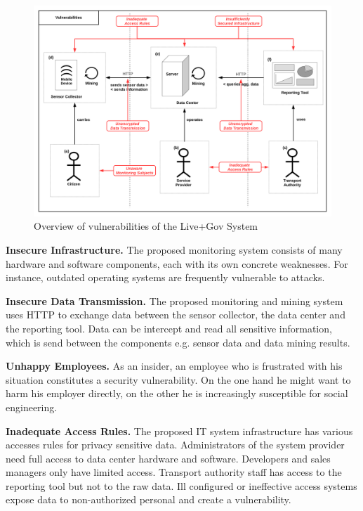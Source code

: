 \documentclass[runningheads,a4paper]{llncs}
\begin{document}
\begin{figure}
\centering
\includegraphics[width=\textwidth]{diagrams/png/vulnerabilities.png}

\caption{Overview of vulnerabilities of the Live+Gov System }
\label{figure:Live+Gov Vulnerabilities}
\end{figure}

\textbf{Insecure Infrastructure.}
The proposed monitoring system consists of many hardware and software components, each with its own concrete weaknesses. For instance, outdated operating systems are frequently vulnerable to attacks.

\textbf{Insecure Data Transmission.}
The proposed monitoring and mining system uses HTTP to exchange data between the sensor collector, the data center and the reporting tool.
Data can be intercept and read all sensitive information, which is send between the components e.g. sensor data and data mining results.

\textbf{Unhappy Employees.}
As an insider, an employee who is frustrated with his situation constitutes a security vulnerability. On the one hand he might
want to harm his employer directly, on the other he is increasingly
susceptible for social engineering.

\textbf{Inadequate Access Rules.}
The proposed IT system infrastructure has various accesses rules for privacy sensitive data.
Administrators of the system provider need full access to data center hardware and software.
Developers and sales managers only have limited access.
Transport authority staff has access to the reporting tool but not to the raw data.
Ill configured or ineffective access systems expose data to non-authorized personal and create a vulnerability.
\end{document}
